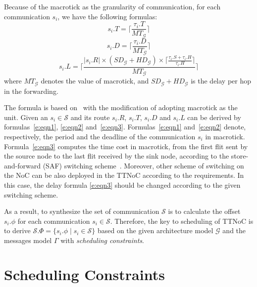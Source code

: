 \documentclass[journal]{IEEEtran}
\newcommand{\calG}{\mathcal{G}}
\newcommand{\calS}{\mathcal{S}}
\newcommand{\SD}{\mathit{SD}_\calG}
\newcommand{\HD}{\mathit{HD}_\calG}
\newcommand{\MT}{\mathit{MT}_\calG}
\begin{document}
Because of the macrotick as the granularity of communication,
for each communication $s_{i}$,
we have the following formulas:
\begin{equation}
\label{e:eqn1}
  s_i.T = \lceil\frac{\tau_{i}.T}{\MT} \rceil
\end{equation}
\begin{equation}
\label{e:eqn2}
  s_i.D = \lceil\frac{\tau_{i}.D}{\MT}\rceil
\end{equation}
\begin{equation}
\label{e:eqn3}
  s_i.L = \lceil\frac{|s_i.R| \times (\SD+\HD) \times
    \lceil\frac{\tau_{i}.S + \tau_{i}.H}{\tau_{i}.H  }\rceil}{\MT}\rceil
\end{equation}
where $\MT$ denotes the value of macrotick, and $\SD+\HD$ is the delay
per hop in the forwarding.

The formula is based on~\cite{DBLP:books/daglib/0087651} with the
modification of adopting macrotick as the unit.  Given an
$s_{i}\in\calS$ and its route $s_i.R$, $s_i.T$, $s_i.D$ and $s_i.L$
can be derived by formulas~\ref{e:eqn1}, \ref{e:eqn2}
and~\ref{e:eqn3}.  Formulas~\ref{e:eqn1} and~\ref{e:eqn2} denote,
respectively, the period and the deadline of the communication $s_i$
in macrotick.  Formula~\ref{e:eqn3} computes the time cost in
macrotick, from the first flit sent by the source node to the last
flit received by the sink node, according to the store-and-forward
(SAF) switching scheme~\cite{DBLP:books/daglib/0087651}.  Moreover,
other scheme of switching on the NoC can be also deployed in the TTNoC
according to the requirements. In this case, the delay formula
\ref{e:eqn3} should be changed according to the given switching
scheme.

As a result, to synthesize the set of communication $\calS$ is to
calculate the offset $s_i.\phi$ for each communication
$s_i\in\calS$. Therefore, the key to scheduling of TTNoC is to derive
$\calS.\Phi = \{s_i.\phi\mid s_i\in\calS\}$ based on the given
architecture model $\calG$ and the messages model $\Gamma$ with
\emph{scheduling constraints}.


\section{Scheduling Constraints\label{s:constraint}}
\end{document}
